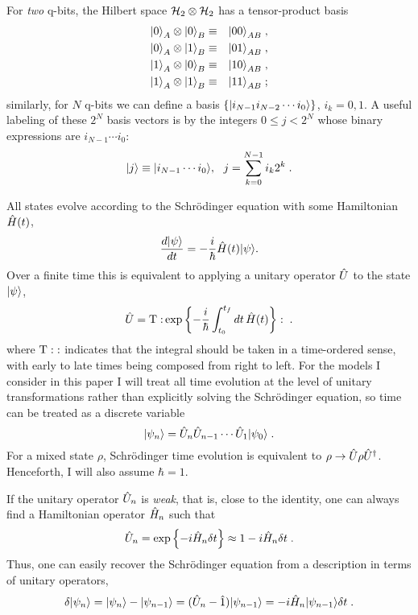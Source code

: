 For {\it two} q-bits, the Hilbert space ${\cal H}_2\otimes{\cal H}_2$
has a tensor-product basis
\begin{eqnarray}
{| 0 \rangle}_A\otimes{| 0 \rangle}_B &\equiv& {| 00 \rangle}_{AB} \;, \nonumber\\
{| 0 \rangle}_A\otimes{| 1 \rangle}_B &\equiv& {| 01 \rangle}_{AB} \;, \nonumber\\
{| 1 \rangle}_A\otimes{| 0 \rangle}_B &\equiv& {| 10 \rangle}_{AB} \;, \nonumber\\
{| 1 \rangle}_A\otimes{| 1 \rangle}_B &\equiv& {| 11 \rangle}_{AB} \;;
\end{eqnarray}
similarly, for $N$ q-bits we can define a basis
$\{ {| i_{N-1}i_{N-2}\cdots i_0 \rangle} \}$, $i_k=0,1$.  A useful labeling of
these $2^N$ basis vectors is by the integers $0\le j < 2^N$ whose
binary expressions are $i_{N-1}\cdots i_0$:
\begin{equation}
\ket{j} \equiv \ket{i_{N-1}\cdots i_0},\ \ 
  j = \sum_{k=0}^{N-1} i_k 2^k \;.
\end{equation}

All states evolve according to the Schr\"odinger equation with some
Hamiltonian ${\hat H}(t)$,
\begin{equation}
{d{| \psi \rangle}\over dt} = - {i\over\hbar} {\hat H}(t) {| \psi \rangle}.
\label{schrodinger}
\end{equation}
Over a finite time this is equivalent to applying a unitary operator
${\hat U}$ to the state ${| \psi \rangle}$,
\begin{equation}
{\hat U} = {\rm T:} \exp \left\{ -{i\over\hbar} \int_{t_0}^{t_f} dt\, {\hat H}(t)
  \right\} : \;.
\end{equation}
where ${\rm T:}:$ indicates that the integral should be taken in a
time-ordered sense, with early to late times being composed from right
to left.  For the models I consider in this paper I will treat all time
evolution at the level of unitary transformations rather than explicitly
solving the Schr\"odinger equation, so time can be treated as a discrete
variable
\begin{equation}
{| \psi_n \rangle} = {\hat U}_n {\hat U}_{n-1} \cdots {\hat U}_1 {| \psi_0 \rangle} \;.
\end{equation}
For a mixed state $\rho$, Schr\"odinger time evolution is
equivalent to $\rho \rightarrow {\hat U} \rho {\hat U^\dagger}$.  Henceforth, I will
also assume $\hbar=1$.

If the unitary operator ${\hat U}_n$ is {\it weak}, that is, close to the
identity, one can always find a Hamiltonian operator ${\hat H}_n$ such that
\begin{equation}
{\hat U}_n = \exp\left\{ -i {\hat H}_n \delta t \right\} \approx 1 - i {\hat H}_n \delta t \;.
\end{equation}
Thus, one can easily recover the Schr\"odinger equation from a description
in terms of unitary operators,
\begin{equation}
\delta{| \psi_n \rangle} = {| \psi_n \rangle} - {| \psi_{n-1} \rangle}
  = ({\hat U}_n - {\hat 1}){| \psi_{n-1} \rangle} = - i{\hat H}_n{| \psi_{n-1} \rangle} \delta t \;.
\end{equation}

